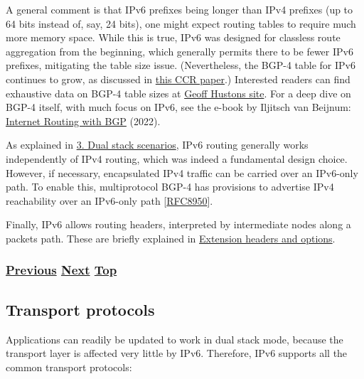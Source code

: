 \documentclass[
]{article}
\begin{document}
A general comment is that IPv6 prefixes being longer than IPv4 prefixes
(up to 64 bits instead of, say, 24 bits), one might expect routing
tables to require much more memory space. While this is true, IPv6 was
designed for classless route aggregation from the beginning, which
generally permits there to be fewer IPv6 prefixes, mitigating the table
size issue. (Nevertheless, the BGP-4 table for IPv6 continues to grow,
as discussed in
\href{https://dl.acm.org/doi/10.1145/3477482.3477490}{this CCR paper}.)
Interested readers can find exhaustive data on BGP-4 table sizes at
\href{https://bgp.potaroo.net/index-bgp.html}{Geoff
Huston\textquotesingle s site}. For a deep dive on BGP-4 itself, with
much focus on IPv6, see the e-book by Iljitsch van Beijnum:
\href{https://www.iljitsch.com/2022/11-18-new-e-book-internet-routing-with-bgp.html}{Internet
Routing with BGP} (2022).

As explained in \hyperref[dual-stack-scenarios]{3. Dual stack
scenarios}, IPv6 routing generally works independently of IPv4 routing,
which was indeed a fundamental design choice. However, if necessary,
encapsulated IPv4 traffic can be carried over an IPv6-only path. To
enable this, multiprotocol BGP-4 has provisions to advertise IPv4
reachability over an IPv6-only path
{[}\href{https://www.rfc-editor.org/info/rfc8950}{RFC8950}{]}.

Finally, IPv6 allows routing headers, interpreted by intermediate nodes
along a packet\textquotesingle s path. These are briefly explained in
\hyperref[extension-headers-and-options]{Extension headers and options}.

\subsubsection{\texorpdfstring{\hyperref[dns]{Previous}
\hyperref[transport-protocols]{Next}
\hyperref[ipv6-basic-technology]{Top}}{Previous Next Top}}\label{previous-next-top-15}

\pagebreak

\subsection{Transport protocols}\label{transport-protocols}

Applications can readily be updated to work in dual stack mode, because
the transport layer is affected very little by IPv6. Therefore, IPv6
supports all the common transport protocols:
\end{document}
